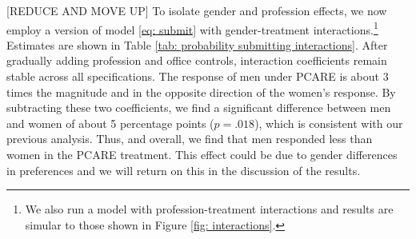 \documentclass[11pt, titlepage]{article}
\begin{document}
{[}REDUCE AND MOVE UP{]} To isolate gender and profession effects, we
now employ a version of model \eqref{eq: submit} with gender-treatment
interactions.\footnote{We also run a model with profession-treatment
  interactions and results are simular to those shown in Figure
  \ref{fig: interactions}.} Estimates are shown in Table
\ref{tab: probability submitting interactions}. After gradually adding
profession and office controls, interaction coefficients remain stable
across all specifications. The response of men under PCARE is about 3
times the magnitude and in the opposite direction of the women's
response. By subtracting these two coefficients, we find a significant
difference between men and women of about 5 percentage points
(\(p=.018\)), which is consistent with our previous analysis. Thus, and
overall, we find that men responded less than women in the PCARE
treatment. This effect could be due to gender differences in preferences
and we will return on this in the discussion of the results.
\end{document}
